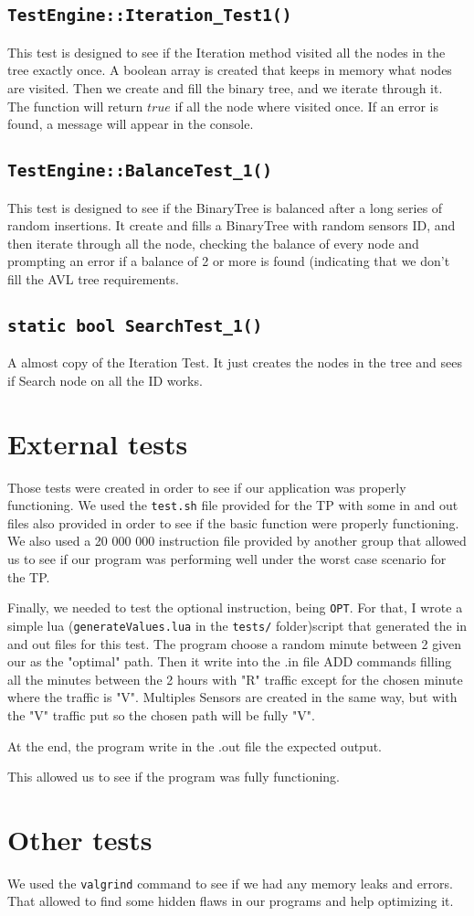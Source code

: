 \documentclass[10pt]{article}
\begin{document}
\subsection{\tt TestEngine::Iteration\_Test1()}
This test is designed to see if the Iteration method visited all the nodes in the tree exactly once. A boolean array is created that keeps in memory what nodes are visited. Then we create and fill the binary tree, and we iterate through it. The function will return $true$ if all the node where visited once. If an error is found, a message will appear in the console.

\subsection{\tt TestEngine::BalanceTest\_1()}
This test is designed to see if the BinaryTree is balanced after a long series of random insertions. It create and fills a BinaryTree with random sensors ID, and then iterate through all the node, checking the balance of every node and prompting an error if a balance of 2 or more is found (indicating that we don't fill the AVL tree requirements.

\subsection{\tt static bool SearchTest\_1()}
A almost copy of the Iteration Test. It just creates the nodes in the tree and sees if Search node on all the ID works.

\section{External tests}
Those tests were created in order to see if our application was properly functioning. We used the \texttt{test.sh} file provided for the TP with some in and out files also provided in order to see if the basic function were properly functioning. We also used a 20 000 000 instruction file provided by another group that allowed us to see if our program was performing well under the worst case scenario for the TP.

Finally, we needed to test the optional instruction, being \texttt{OPT}. For that, I wrote a simple lua (\texttt{generateValues.lua} in the \texttt{tests/} folder)script that generated the in and out files for this test. The program choose a random minute between 2 given our as the "optimal" path. Then it write into the .in file ADD commands filling all the minutes between the 2 hours with "R" traffic except for the chosen minute where the traffic is "V". Multiples Sensors are created in the same way, but with the "V" traffic put so the chosen path will be fully "V".

At the end, the program write in the .out file the expected output.

This allowed us to see if the program was fully functioning.

\section{Other tests}
We used the {\tt valgrind} command to see if we had any memory leaks and errors. That allowed to find some hidden flaws in our programs and help optimizing it.
\end{document}
